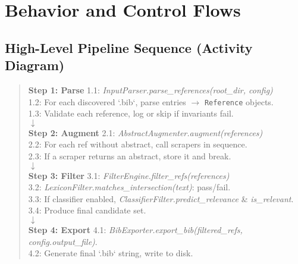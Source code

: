 \documentclass[12pt]{article}
\begin{document}
\section{Behavior and Control Flows}

\subsection{High-Level Pipeline Sequence (Activity Diagram)}

\begin{quote}
\textbf{Step 1: Parse}  
\hspace*{1em}1.1: \emph{InputParser.parse\_references(root\_dir, config)} \\
\hspace*{1em}1.2: For each discovered `.bib`, parse entries $\to$ \texttt{Reference} objects. \\
\hspace*{1em}1.3: Validate each reference, log or skip if invariants fail. \\
$\downarrow$ \\
\textbf{Step 2: Augment}  
\hspace*{1em}2.1: \emph{AbstractAugmenter.augment(references)} \\
\hspace*{1em}2.2: For each ref without abstract, call scrapers in sequence. \\
\hspace*{1em}2.3: If a scraper returns an abstract, store it and break. \\
$\downarrow$ \\
\textbf{Step 3: Filter}  
\hspace*{1em}3.1: \emph{FilterEngine.filter\_refs(references)} \\
\hspace*{1em}3.2: \emph{LexiconFilter.matches\_intersection(text)}: pass/fail. \\
\hspace*{1em}3.3: If classifier enabled, \emph{ClassifierFilter.predict\_relevance} \& \emph{is\_relevant}. \\
\hspace*{1em}3.4: Produce final candidate set. \\
$\downarrow$ \\
\textbf{Step 4: Export}  
\hspace*{1em}4.1: \emph{BibExporter.export\_bib(filtered\_refs, config.output\_file)}. \\
\hspace*{1em}4.2: Generate final `.bib` string, write to disk. \\
\end{quote}
\end{document}
